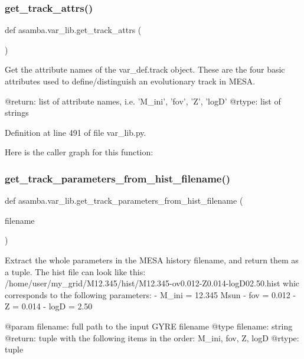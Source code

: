 \subsubsection{\texorpdfstring{get\+\_\+track\+\_\+attrs()}{get\_track\_attrs()}}
{\footnotesize\ttfamily def asamba.\+var\+\_\+lib.\+get\+\_\+track\+\_\+attrs (\begin{DoxyParamCaption}{ }\end{DoxyParamCaption})}

\begin{DoxyVerb}Get the attribute names of the var_def.track object. These are the four basic attributes used to 
define/distinguish an evolutionary track in MESA.

@return: list of attribute names, i.e. 'M_ini', 'fov', 'Z', 'logD'
@rtype: list of strings
\end{DoxyVerb}
 

Definition at line 491 of file var\+\_\+lib.\+py.

Here is the caller graph for this function\+:
\mbox{\label{namespaceasamba_1_1var__lib_a0aceded8224b425f6576bad342e05069}} 
\subsubsection{\texorpdfstring{get\+\_\+track\+\_\+parameters\+\_\+from\+\_\+hist\+\_\+filename()}{get\_track\_parameters\_from\_hist\_filename()}}
{\footnotesize\ttfamily def asamba.\+var\+\_\+lib.\+get\+\_\+track\+\_\+parameters\+\_\+from\+\_\+hist\+\_\+filename (\begin{DoxyParamCaption}\item[{}]{filename }\end{DoxyParamCaption})}

\begin{DoxyVerb}Extract the whole parameters in the MESA history filename, and return them as a tuple. The hist 
file can look like this:
/home/user/my_grid/M12.345/hist/M12.345-ov0.012-Z0.014-logD02.50.hist
whic corresponds to the following parameters:
- M_ini    = 12.345 Msun
- fov      = 0.012
- Z        = 0.014
- logD     = 2.50

@param filename: full path to the input GYRE filename
@type filename: string
@return: tuple with the following items in the order: M_ini, fov, Z, logD
@rtype: tuple
\end{DoxyVerb}
 

